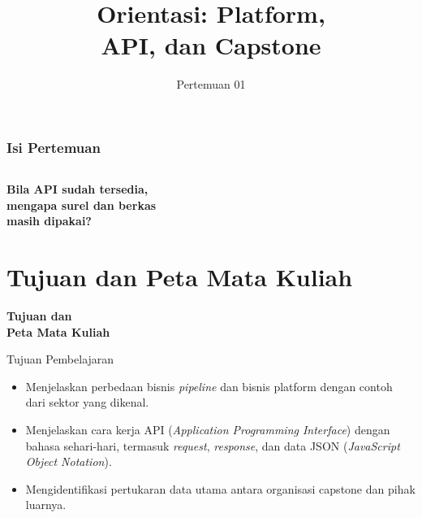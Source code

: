 \documentclass[aspectratio=169, table, 12pt]{beamer}
\title{\Huge Orientasi: Platform,\\ \vspace{10pt} API, dan Capstone}
\date{Pertemuan 01}
\begin{document}
\frame{\titlepage}

\begin{frame}
  \frametitle{Isi Pertemuan}
  \vspace{14pt}
  \begin{columns}[t]
    {\small\tableofcontents[sections={1-3}]}

    {\small\tableofcontents[sections={4-6}]}
  \end{columns}
\end{frame}

\begin{frame}{\hfill}
  \centering
  \Huge{\textbf{Bila API sudah tersedia,\\mengapa surel dan berkas\\masih dipakai?}}
\end{frame}

\section{Tujuan dan Peta Mata Kuliah}

\begin{frame}{\hfill}
  \centering
  \Huge{\textbf{Tujuan dan\\Peta Mata Kuliah}}
\end{frame}

\begin{frame}{{\Large Tujuan Pembelajaran}}
  \vspace{10pt}
  \begin{itemize}
    \item Menjelaskan perbedaan bisnis \textit{pipeline} dan bisnis platform dengan contoh dari sektor yang dikenal.
    \item Menjelaskan cara kerja API (\textit{Application Programming Interface}) dengan bahasa sehari-hari, termasuk \textit{request}, \textit{response}, dan data JSON (\textit{JavaScript Object Notation}).
    \item Mengidentifikasi pertukaran data utama antara organisasi capstone dan pihak luarnya.
  \end{itemize}
\end{frame}
\end{document}

